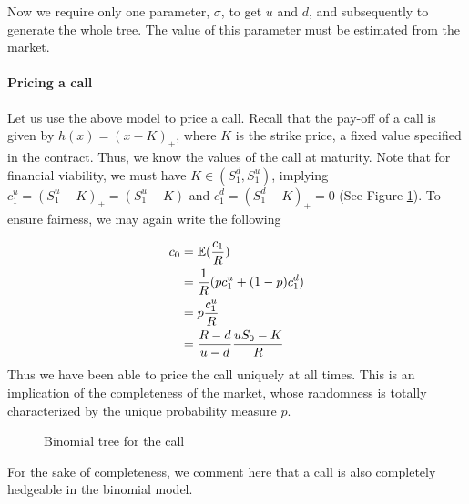Now we require only one parameter, $ \sigma $, to get $ u $ and $ d $, and subsequently to generate the whole tree. The value of this parameter must be estimated from the market.


\paragraph{Pricing a call}


Let us use the above model to price a call. Recall that the pay-off of a call is given by $ h(x) = (x - K)_+ $, where $ K $ is the strike price, a fixed value specified in the contract. Thus, we know the values of the call at maturity. Note that for financial viability, we must have $ K \in (S_1^d, S_1^u) $, implying $ c_1^u = (S_1^u - K)_+ = (S_1^u - K) $ and $ c_1^d = (S_1^d - K)_+ = 0 $ (See Figure \ref{fig:discrete-2tr-call}). To ensure fairness, we may again write the following


\begin{align*}
	c_0 &= \operatorname{\mathbb{E}}(\frac{c_1}{R}) \\
	    &= \frac{1}{R} ( p c_1^u + (1-p) c_1^d ) \\
	    &= p \frac{c_1^u}{R} \\
	    &= \frac{R - d}{u - d} \frac{u S_0 - K}{R}
\end{align*}
Thus we have been able to price the call uniquely at all times. This is an implication of the completeness of the market, whose randomness is totally characterized by the unique probability measure $ p $.


\begin{figure}[h]
	
	\caption{Binomial tree for the call}
	\label{fig:discrete-2tr-call}
\end{figure}


For the sake of completeness, we comment here that a call is also completely hedgeable in the binomial model.







